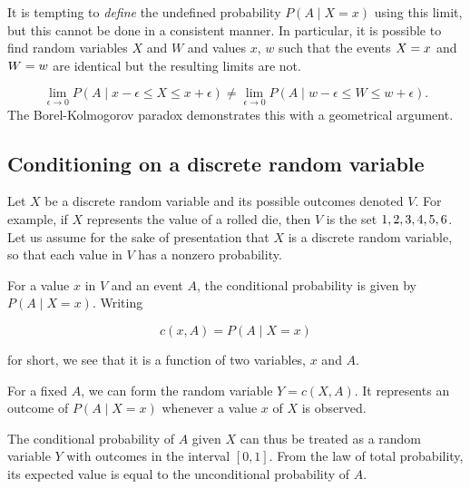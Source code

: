 It is tempting to \textit{define} the undefined probability $P(A \mid X = x)$ using this
limit, but this cannot be done in a consistent manner. In particular, it is possible to
find random variables $X$ and $W$ and values $x$, $w$ such that the events $\\{X = x\\}$
and $\\{W = w\\}$ are identical but the resulting limits are not.



$$\lim _{\epsilon \to 0} P(A \mid x-\epsilon \le X \le x+\epsilon) \neq \lim _{\epsilon
\to 0} P(A \mid w-\epsilon \le W \le w+\epsilon).$$ The Borel-Kolmogorov paradox
demonstrates this with a geometrical argument.




\subsection{Conditioning on a discrete random variable}
\label{sss:cond-341a}




Let $X$ be a discrete random variable and its possible outcomes denoted $V$. For example,
if $X$ represents the value of a rolled die, then $V$ is the set $\\{ 1, 2, 3, 4, 5, 6
\\}$. Let us assume for the sake of presentation that $X$ is a discrete random variable,
so that each value in $V$ has a nonzero probability.



For a value $x$ in $V$ and an event $A$, the conditional probability is given by $P(A \mid
X=x)$. Writing



$$c(x, A) = P(A \mid X=x)$$



for short, we see that it is a function of two variables, $x$ and $A$.



For a fixed $A$, we can form the random variable $Y = c(X, A)$. It represents an outcome
of $P(A \mid X=x)$ whenever a value $x$ of $X$ is observed.



The conditional probability of $A$ given $X$ can thus be treated as a random variable $Y$
with outcomes in the interval $[0,1]$. From the law of total probability, its expected
value is equal to the unconditional probability of $A$.




